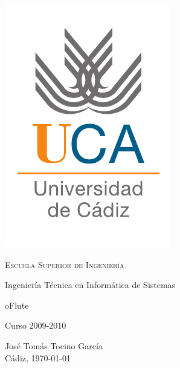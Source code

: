 \begin{titlepage}
  \centering
  \includegraphics[width=.3\textwidth]{logo_uca}

  \bigskip
  \bigskip
  \bigskip
  
    \centering

    {\Huge \textsc{\nohyphens{Escuela Superior de Ingeniería}}}
    
    \bigskip
    \bigskip
    \bigskip

    {\huge \nohyphens{Ingeniería Técnica en Informática de Sistemas}}

    \bigskip
    \bigskip
    \bigskip
    \bigskip
    \bigskip
    \bigskip

    {\LARGE \nohyphens{oFlute}}

    \bigskip
    \bigskip
    \bigskip
    \bigskip

    {\large Curso 2009-2010}

    \bigskip
    \bigskip
    \bigskip
    \bigskip
    \bigskip
    \bigskip
    \bigskip
      

  {\Large José Tomás Tocino García \\}
  {\large Cádiz, \today}

\end{titlepage}